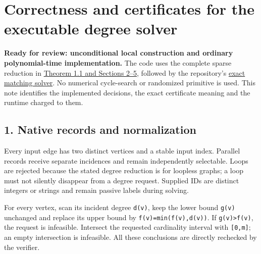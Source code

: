 
\hypertarget{af-5f2ce72611-correctness-and-certificates-for-the-executable-degree-solver}{%
\section{Correctness and certificates for the executable degree solver}\label{af-5f2ce72611-correctness-and-certificates-for-the-executable-degree-solver}}

\textbf{Ready for review: unconditional local construction and ordinary polynomial-time implementation.} The code uses the complete sparse reduction in \href{https://github.com/icekylinx/algorithm-frontier/blob/main/problems/degree-constrained-subgraphs/proof.md}{Theorem 1.1 and Sections 2--5}, followed by the repository's \href{https://github.com/icekylinx/algorithm-frontier/blob/main/problems/general-matching/reference/README.md}{exact matching solver}. No numerical cycle-search or randomized primitive is used. This note identifies the implemented decisions, the exact certificate meaning and the runtime charged to them.

\hypertarget{af-5f2ce72611-native-records-and-normalization}{%
\subsection{1. Native records and normalization}\label{af-5f2ce72611-native-records-and-normalization}}

Every input edge has two distinct vertices and a stable input index. Parallel records receive separate incidences and remain independently selectable. Loops are rejected because the stated degree reduction is for loopless graphs; a loop must not silently disappear from a degree request. Supplied IDs are distinct integers or strings and remain passive labels during solving.

For every vertex, scan its incident degree \texttt{d(v)}, keep the lower bound \texttt{g(v)} unchanged and replace its upper bound by \texttt{f(v)=min(f(v),d(v))}. If \texttt{g(v)\textgreater{}f(v)}, the request is infeasible. Intersect the requested cardinality interval with \texttt{{[}0,m{]}}; an empty intersection is infeasible. All these conclusions are directly rechecked by the verifier.

